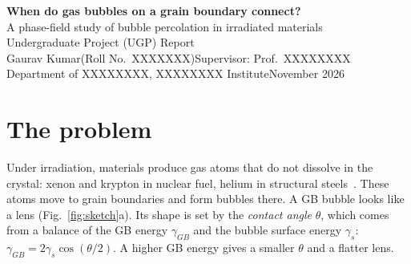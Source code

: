 \documentclass[11pt,a4paper]{article}
\newcommand{\studentname}{Gaurav Kumar}
\newcommand{\rollno}{Roll No.\ XXXXXXX}
\newcommand{\supervisor}{Prof.\ XXXXXXXX}
\newcommand{\department}{Department of XXXXXXXX, XXXXXXXX Institute}
\begin{document}
\begin{center}
{\LARGE\bfseries When do gas bubbles on a grain boundary connect?}\\[4pt]
{\large A phase-field study of bubble percolation in irradiated materials}\\[8pt]
Undergraduate Project (UGP) Report\\[4pt]
\studentname\quad(\rollno)\qquad Supervisor: \supervisor\\
\department\qquad November 2026
\end{center}

\begin{abstract}
\noindent
\textbf{Problem.} Irradiation creates gas atoms (He, Xe, Kr) that collect on
grain boundaries (GBs) as small bubbles. As the bubbles grow they touch and
join. When they form one connected network (\emph{percolation}), gas can escape
and the boundary becomes weak. We want to know at what \emph{coverage} (fraction
of the GB covered by bubbles) this happens, and what controls it.
\textbf{What we did.} We wrote a 3-D phase-field code (Cahn--Hilliard equation
for the gas, Allen--Cahn equations for the grains). We first studied one bubble
and used it to fix the simulation parameters. We then grew 33 and 25 bubbles on
one GB, changed the contact angle $\theta$ (via the GB energy), and tracked how
the bubbles join. Finally we made the GB move and repeated the test.
\textbf{Main findings.} (1) Percolation starts at the same coverage (0.39 for 33
bubbles) for every contact angle, and ends at the same coverage (0.70--0.72) for
the angles that reach the end; the angle mainly changes \emph{how fast} this
happens (3.4$\times$). (2) Fewer bubbles shift both values to lower coverage.
(3) Very round bubbles ($\theta\ge128^\circ$) stop joining. (4) A moving GB is
not pinned by the bubbles; it drags them along. (5) The percolation curve is the
same whether the GB moves or not.
\end{abstract}

\section{The problem}

Under irradiation, materials produce gas atoms that do not dissolve in the
crystal: xenon and krypton in nuclear fuel, helium in structural
steels~\cite{Trinkaus2003,Tonks2018}. These atoms move to grain boundaries and
form bubbles there. A GB bubble looks like a lens (Fig.~\ref{fig:sketch}a). Its
shape is set by the \emph{contact angle} $\theta$, which comes from a balance of
the GB energy $\gamma_{GB}$ and the bubble surface energy
$\gamma_s$: $\gamma_{GB}=2\gamma_s\cos(\theta/2)$. A higher GB energy gives a
smaller $\theta$ and a flatter lens.
\end{document}
